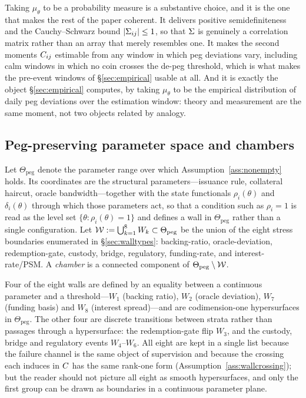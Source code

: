 \begin{remark}\label{rem:cov-two-consequences}
Taking $\mu_\theta$ to be a probability measure is a substantive choice, and it is the one that makes the rest of the paper coherent. It delivers positive semidefiniteness and the Cauchy--Schwarz bound $|\Sigma_{ij}|\le 1$, so that $\Sigma$ is genuinely a correlation matrix rather than an array that merely resembles one. It makes the second moments $C_{ij}$ estimable from any window in which peg deviations vary, including calm windows in which no coin crosses the de-peg threshold, which is what makes the pre-event windows of \S\ref{sec:empirical} usable at all. And it is exactly the object \S\ref{sec:empirical} computes, by taking $\mu_\theta$ to be the empirical distribution of daily peg deviations over the estimation window: theory and measurement are the same moment, not two objects related by analogy.
\end{remark}

\subsection{Peg-preserving parameter space and chambers}\label{sec:chambers}
\begin{definition}\label{def:chamber}
Let $\Theta_{\mathrm{peg}}$ denote the parameter range over which Assumption~\ref{ass:nonempty} holds. Its coordinates are the structural parameters---issuance rule, collateral haircut, oracle bandwidth---together with the state functionals $\rho_i(\theta)$ and $\delta_i(\theta)$ through which those parameters act, so that a condition such as $\rho_i=1$ is read as the level set $\{\theta : \rho_i(\theta)=1\}$ and defines a wall in $\Theta_{\mathrm{peg}}$ rather than a single configuration. Let $\mathcal{W} := \bigcup_{k=1}^{8} W_k \subset \Theta_{\mathrm{peg}}$ be the union of the eight stress boundaries enumerated in \S\ref{sec:walltypes}: backing-ratio, oracle-deviation, redemption-gate, custody, bridge, regulatory, funding-rate, and interest-rate/PSM. A \emph{chamber} is a connected component of $\Theta_{\mathrm{peg}} \setminus \mathcal{W}$.
\end{definition}

Four of the eight walls are defined by an equality between a continuous parameter and a threshold---$W_1$ (backing ratio), $W_2$ (oracle deviation), $W_7$ (funding basis) and $W_8$ (interest spread)---and are codimension-one hypersurfaces in $\Theta_{\mathrm{peg}}$. The other four are discrete transitions between strata rather than passages through a hypersurface: the redemption-gate flip $W_3$, and the custody, bridge and regulatory events $W_4$--$W_6$. All eight are kept in a single list because the failure channel is the same object of supervision and because the crossing each induces in $C$ has the same rank-one form (Assumption~\ref{ass:wallcrossing}); but the reader should not picture all eight as smooth hypersurfaces, and only the first group can be drawn as boundaries in a continuous parameter plane.

